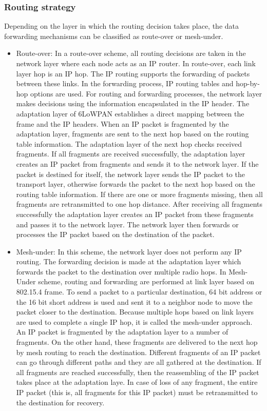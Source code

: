 \documentclass[11pt,draftclsnofoot,onecolumn]{IEEEtran}
\begin{document}
\subsubsection{Routing strategy}
Depending on the layer in which the routing decision takes place, the data forwarding mechanisms can be classified as route-over or mesh-under. 

\begin{itemize}
\item Route-over: In a route-over scheme, all routing decisions are taken in the network layer where each node acts as an IP router. In route-over, each link layer hop is an IP hop. The IP routing supports the forwarding of packets between these links. In the forwarding process, IP routing tables and hop-by-hop options are used. For routing and forwarding processes, the network layer makes decisions using the information encapsulated in the IP header. The adaptation layer of 6LoWPAN establishes a direct mapping between the frame and the IP headers. When an IP packet is fragmented by the adaptation layer, fragments are sent to the next hop based on the routing table information. The adaptation layer of the next hop checks received fragments. If all fragments are received successfully, the adaptation layer creates an IP packet from fragments and sends it to the network layer. If the packet is destined for itself, the network layer sends the IP packet to the transport layer, otherwise forwards the packet to the next hop based on the routing table information. If there are one or more fragments missing, then all fragments are retransmitted to one hop distance. After receiving all fragments successfully the adaptation layer creates an IP packet from these fragments and passes it to the network layer. The network layer then forwards or processes the IP packet based on the destination of the packet.

\item Mesh-under: In this scheme, the network layer does not perform any IP routing. The forwarding decision is made at the adaptation layer which forwards the packet to the destination over multiple radio hops. In Mesh-Under scheme, routing and forwarding are performed at link layer based on 802.15.4 frame. To send a packet to a particular destination, 64 bit address or the 16 bit short address is used and sent it to a neighbor node to move the packet closer to the destination. Because multiple hops based on link layers are used to complete a single IP hop, it is called the mesh-under approach. An IP packet is fragmented by the adaptation layer to a number of fragments. On the other hand, these fragments are delivered to the next hop by mesh routing to reach the destination. Different fragments of an IP packet can go through different paths and they are all gathered at the destination. If all fragments are reached successfully, then the reassembling of the IP packet takes place at the adaptation laye. In case of loss of any fragment, the entire IP packet (this is, all fragments for this IP packet) must be retransmitted to the destination for recovery.
\end{itemize}
\end{document}
